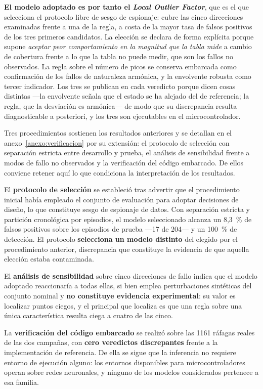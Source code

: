 \textbf{El modelo adoptado es por tanto el \textit{Local Outlier Factor}}, que es el que
selecciona el protocolo libre de sesgo de espionaje: cubre las cinco direcciones examinadas
frente a una de la regla, a costa de la mayor tasa de falsos positivos de los tres primeros
candidatos. La elección se declara de forma explícita porque supone \textit{aceptar peor
comportamiento en la magnitud que la tabla mide} a cambio de cobertura frente a lo que la tabla
no puede medir, que son los fallos no observados. La regla sobre el número de picos se conserva
embarcada como confirmación de los fallos de naturaleza armónica, y la envolvente robusta como
tercer indicador. Los tres se publican en cada veredicto porque dicen cosas distintas —la
envolvente señala que el estado se ha alejado del de referencia; la regla, que la desviación es
armónica— de modo que su discrepancia resulta diagnosticable a posteriori, y los tres son
ejecutables en el microcontrolador.

Tres procedimientos sostienen los resultados anteriores y se detallan en el
anexo~\ref{anexo:verificacion} por su extensión: el protocolo de selección con separación
estricta entre desarrollo y prueba, el análisis de sensibilidad frente a modos de fallo no
observados y la verificación del código embarcado. De ellos conviene retener aquí lo que
condiciona la interpretación de los resultados.

El \textbf{protocolo de selección} se estableció tras advertir que el procedimiento inicial había
empleado el conjunto de evaluación para adoptar decisiones de diseño, lo que constituye sesgo de
espionaje de datos. Con separación estricta y partición cronológica por episodios, el modelo
seleccionado alcanza un \mbox{8,3 \%} de falsos positivos sobre los episodios de prueba —17 de
204— y un \mbox{100 \%} de detección. El protocolo \textbf{selecciona un modelo distinto} del
elegido por el procedimiento anterior, discrepancia que constituye la evidencia de que aquella
elección estaba contaminada.

El \textbf{análisis de sensibilidad} sobre cinco direcciones de fallo indica que el modelo adoptado
reaccionaría a todas ellas, si bien emplea perturbaciones sintéticas del conjunto nominal y
\textbf{no constituye evidencia experimental}: su valor es localizar puntos ciegos, y el principal
que localiza es que una regla sobre una única característica resulta ciega a cuatro de las cinco.

La \textbf{verificación del código embarcado} se realizó sobre las 1161 ráfagas reales de las dos
campañas, con \textbf{cero veredictos discrepantes} frente a la implementación de referencia. De
ella se sigue que la inferencia no requiere entorno de ejecución alguno: los entornos disponibles
para microcontroladores operan sobre redes neuronales, y ninguno de los modelos considerados
pertenece a esa familia.

